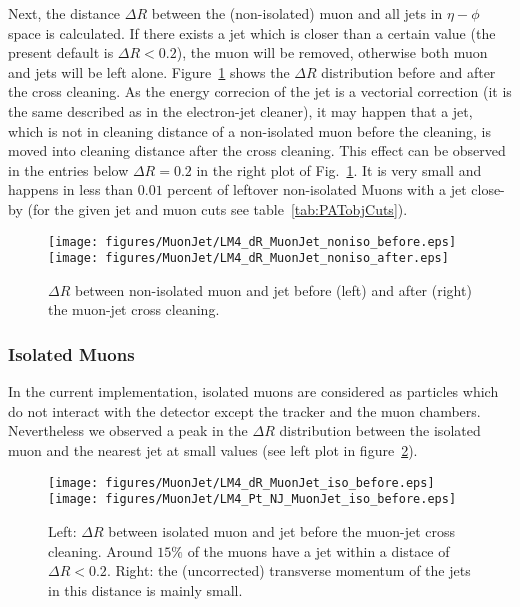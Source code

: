 \documentclass{cmspaper}
\begin{document}
Next, the distance \(\Delta R\) between the (non-isolated) muon and all jets in
\(\eta - \phi\) space is calculated. If there exists a jet which is closer than
a certain value (the present default is \(\Delta R < 0.2\)), the muon will be
removed, otherwise both muon and jets will be left alone.
Figure~\ref{fig:dR_MuonJet_noniso} shows the $\Delta R$ distribution before and
after the cross cleaning. As the energy correcion of the jet is a vectorial
correction (it is the same described as in the electron-jet cleaner), it may
happen that a jet, which is not in cleaning distance of a non-isolated muon
before the cleaning, is moved into cleaning distance after the cross cleaning.
This effect can be observed in the entries below $\Delta R=0.2$ in the right plot of Fig.~\ref{fig:dR_MuonJet_noniso}. It is very small and happens in less than \(0.01\) percent of leftover
non-isolated Muons with a jet close-by (for the given jet and muon
cuts see table~\ref{tab:PATobjCuts}).

\begin{figure}[hb]
\begin{center}
    \texttt{[image: figures/MuonJet/LM4\_dR\_MuonJet\_noniso\_before.eps]}
    \texttt{[image: figures/MuonJet/LM4\_dR\_MuonJet\_noniso\_after.eps]}
    \caption{\(\Delta R\) between non-isolated muon and jet before (left) and
    after (right) the muon-jet cross cleaning.}
\label{fig:dR_MuonJet_noniso}
\end{center}
\end{figure}

\subsubsection{Isolated Muons}

In the current implementation, isolated muons are considered as particles which do not interact with the detector except the tracker and the muon chambers. Nevertheless we observed a peak in the \(\Delta R\) distribution between the isolated muon and the nearest jet at small values (see left plot in figure~\ref{fig:dR_MuonJet_iso}).

\begin{figure}[hb]
\begin{center}
    \texttt{[image: figures/MuonJet/LM4\_dR\_MuonJet\_iso\_before.eps]}
    \texttt{[image: figures/MuonJet/LM4\_Pt\_NJ\_MuonJet\_iso\_before.eps]}
    \caption{Left: \(\Delta R\) between isolated muon and jet before the muon-jet cross cleaning. Around \(15\%\) of the muons have a jet within a distace of \(\Delta R < 0.2\). Right: the (uncorrected) transverse momentum of the jets in this distance is mainly small.}
\label{fig:dR_MuonJet_iso}
\end{center}
\end{figure}
\end{document}
